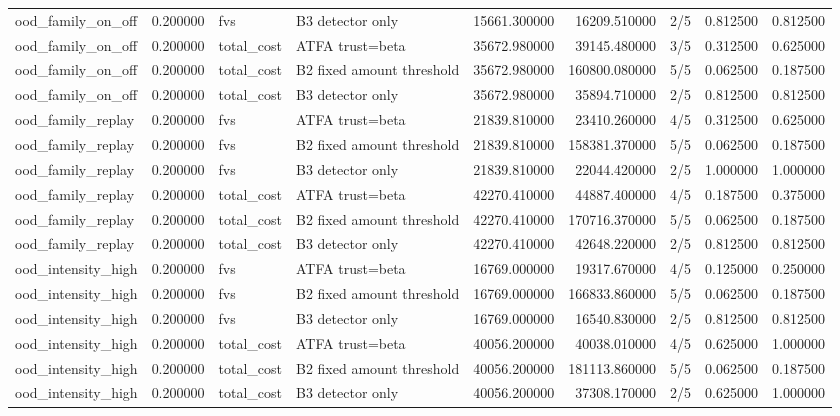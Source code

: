 \begin{tabular}{lrllrrlrr}
ood\_family\_on\_off & 0.200000 & fvs & B3 detector only & 15661.300000 & 16209.510000 & 2/5 & 0.812500 & 0.812500 \\
ood\_family\_on\_off & 0.200000 & total\_cost & ATFA trust=beta & 35672.980000 & 39145.480000 & 3/5 & 0.312500 & 0.625000 \\
ood\_family\_on\_off & 0.200000 & total\_cost & B2 fixed amount threshold & 35672.980000 & 160800.080000 & 5/5 & 0.062500 & 0.187500 \\
ood\_family\_on\_off & 0.200000 & total\_cost & B3 detector only & 35672.980000 & 35894.710000 & 2/5 & 0.812500 & 0.812500 \\
ood\_family\_replay & 0.200000 & fvs & ATFA trust=beta & 21839.810000 & 23410.260000 & 4/5 & 0.312500 & 0.625000 \\
ood\_family\_replay & 0.200000 & fvs & B2 fixed amount threshold & 21839.810000 & 158381.370000 & 5/5 & 0.062500 & 0.187500 \\
ood\_family\_replay & 0.200000 & fvs & B3 detector only & 21839.810000 & 22044.420000 & 2/5 & 1.000000 & 1.000000 \\
ood\_family\_replay & 0.200000 & total\_cost & ATFA trust=beta & 42270.410000 & 44887.400000 & 4/5 & 0.187500 & 0.375000 \\
ood\_family\_replay & 0.200000 & total\_cost & B2 fixed amount threshold & 42270.410000 & 170716.370000 & 5/5 & 0.062500 & 0.187500 \\
ood\_family\_replay & 0.200000 & total\_cost & B3 detector only & 42270.410000 & 42648.220000 & 2/5 & 0.812500 & 0.812500 \\
ood\_intensity\_high & 0.200000 & fvs & ATFA trust=beta & 16769.000000 & 19317.670000 & 4/5 & 0.125000 & 0.250000 \\
ood\_intensity\_high & 0.200000 & fvs & B2 fixed amount threshold & 16769.000000 & 166833.860000 & 5/5 & 0.062500 & 0.187500 \\
ood\_intensity\_high & 0.200000 & fvs & B3 detector only & 16769.000000 & 16540.830000 & 2/5 & 0.812500 & 0.812500 \\
ood\_intensity\_high & 0.200000 & total\_cost & ATFA trust=beta & 40056.200000 & 40038.010000 & 4/5 & 0.625000 & 1.000000 \\
ood\_intensity\_high & 0.200000 & total\_cost & B2 fixed amount threshold & 40056.200000 & 181113.860000 & 5/5 & 0.062500 & 0.187500 \\
ood\_intensity\_high & 0.200000 & total\_cost & B3 detector only & 40056.200000 & 37308.170000 & 2/5 & 0.625000 & 1.000000 \\

\end{tabular}
